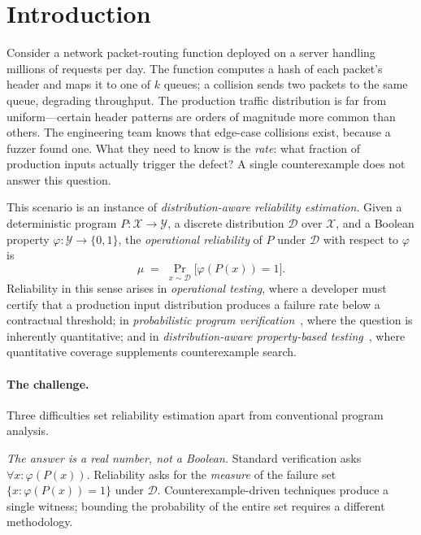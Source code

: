 \documentclass[runningheads]{llncs}
\newcommand{\inX}{\mathcal{X}}
\newcommand{\inY}{\mathcal{Y}}
\newcommand{\dist}{\mathcal{D}}
\newcommand{\prog}{P}
\newcommand{\prop}{\varphi}
\newcommand{\mutrue}{\mu}
\begin{document}

\section{Introduction}\label{sec:intro}

Consider a network packet-routing function deployed on a server
handling millions of requests per day.  The function computes a hash
of each packet's header and maps it to one of $k$ queues; a collision
sends two packets to the same queue, degrading throughput.  The
production traffic distribution is far from uniform---certain header
patterns are orders of magnitude more common than others.  The
engineering team knows that edge-case collisions exist, because a
fuzzer found one.  What they need to know is the \emph{rate}: what
fraction of production inputs actually trigger the defect?  A single
counterexample does not answer this question.

This scenario is an instance of \emph{distribution-aware reliability
  estimation}.  Given a deterministic program $\prog : \inX \to \inY$,
a discrete distribution $\dist$ over $\inX$, and a Boolean property
$\prop : \inY \to \{0,1\}$, the \emph{operational reliability} of
$\prog$ under $\dist$ with respect to $\prop$ is
\begin{equation}\label{eq:mu-def}
  \mutrue \;=\; \Pr_{x \sim \dist}\!\big[\prop(\prog(x)) = 1\big].
\end{equation}
Reliability in this sense arises in \emph{operational testing}, where
a developer must certify that a production input distribution produces
a failure rate below a contractual threshold; in \emph{probabilistic
  program
  verification}~\cite{geldenhuys2012pse,filieri2015tacas}, where the
question is inherently quantitative; and in \emph{distribution-aware
  property-based
  testing}~\cite{maciver2019hypothesis,claessen2000quickcheck}, where
quantitative coverage supplements counterexample search.

\paragraph{The challenge.}
Three difficulties set reliability estimation apart from conventional
program analysis.

\emph{The answer is a real number, not a Boolean.}  Standard
verification asks $\forall x\colon \prop(\prog(x))$.  Reliability asks
for the \emph{measure} of the failure set $\{x : \prop(\prog(x))=1\}$
under $\dist$.  Counterexample-driven techniques produce a single
witness; bounding the probability of the entire set requires a
different methodology.
\end{document}
